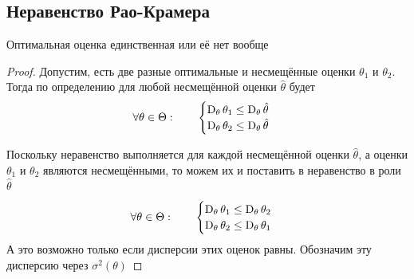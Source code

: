 \subsection{Неравенство Рао-Крамера}
\begin{theorem}
  \label{theorem:Kolmogorov}
  Оптимальная оценка единственная или её нет вообще
\end{theorem}
\begin{proof}
  Допустим,
  есть две разные оптимальные и несмещённые оценки $\theta_1$ и $\theta_2$.
  Тогда по определению для любой несмещённой оценки $\hat{\theta}$ будет
  \begin{align*}
    \forall\theta\in\Theta:\qquad
    \begin{cases}
      \operatorname{D}_{\theta} \theta_1
        \le\operatorname{D}_{\theta} \hat{\theta}\\
      \operatorname{D}_{\theta} \theta_2
        \le\operatorname{D}_{\theta} \hat{\theta}
    \end{cases}
  \end{align*}

  Поскольку неравенство выполняется
  для каждой несмещённой оценки $\hat{\theta}$,
  а оценки $\theta_1$ и $\theta_2$ являются несмещёнными,
  то можем их и поставить в неравенство в роли $\hat{\theta}$

  \begin{align*}
    \forall\theta\in\Theta:\qquad
    \begin{cases}
      \operatorname{D}_{\theta} \theta_1
        \le\operatorname{D}_{\theta} \theta_2\\
      \operatorname{D}_{\theta} \theta_2
        \le\operatorname{D}_{\theta} \theta_1
    \end{cases}
  \end{align*}
  А это возможно только если дисперсии этих оценок равны.
  Обозначим эту дисперсию через $\sigma^2\left(\theta\right)$


\end{proof}
